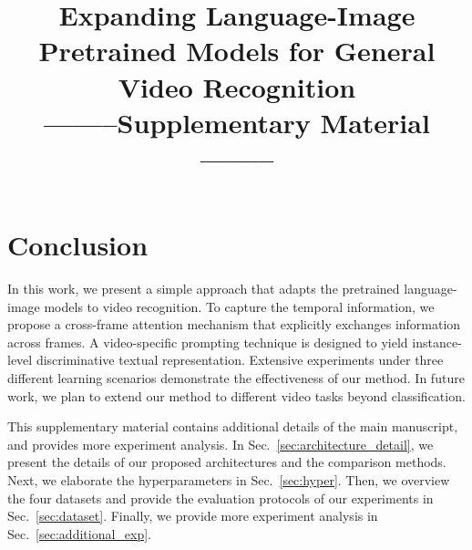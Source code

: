 \documentclass[runningheads]{llncs}
\begin{document}
\section{Conclusion}
In this work, we present a simple approach that adapts the pretrained language-image models to video recognition. To capture the temporal information, we propose a cross-frame attention mechanism that explicitly exchanges information across frames. A video-specific prompting technique is designed to yield instance-level discriminative textual representation. Extensive experiments under three different learning scenarios demonstrate the effectiveness of our method. In future work, we
plan to extend our method to different video tasks beyond classification.


\clearpage
%
%



\title{Expanding Language-Image Pretrained Models for General Video Recognition \\ --------Supplementary Material--------}



%

%
\author{ }
\institute{ }
%

\maketitle
This supplementary material contains additional details of the main manuscript, and provides more experiment analysis. 
In Sec.~\ref{sec:architecture_detail}, we present the details of our proposed architectures and the comparison methods. Next, we elaborate the hyperparameters in Sec.~\ref{sec:hyper}. Then, we overview the four datasets and provide the evaluation protocols of our experiments in Sec.~\ref{sec:dataset}. Finally, we provide more experiment analysis in Sec.~\ref{sec:additional_exp}.
\end{document}
